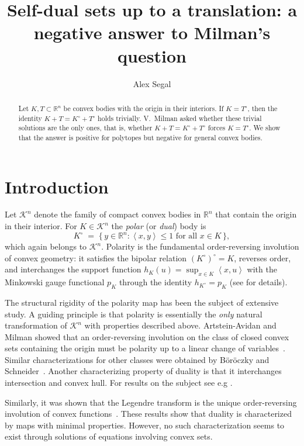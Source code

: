 \documentclass[12pt]{article}
\title{Self-dual sets up to a translation: a negative answer to Milman's question}
\author{Alex Segal}
\date{}
\theoremstyle{remark}
\newcommand{\R}{\mathbb R}
\newcommand{\Kn}{\mathcal{K}^n}
\newcommand{\pol}[1]{#1^{\circ}}
\newcommand{\ip}[2]{\left\langle #1,#2\right\rangle}
\begin{document}
\maketitle


\begin{abstract}
Let \(K,T\subset\mathbb R^n\) be convex bodies with the origin in their
interiors. If \(K=T^\circ\), then the identity
\(
K+T=K^\circ+T^\circ
\)
holds trivially. V.~Milman asked whether these trivial solutions are the only
ones, that is, whether
\(
K+T=K^\circ+T^\circ
\)
forces \(K=T^\circ\). We show that the answer is positive for polytopes but
negative for general convex bodies.
\end{abstract}

\section{Introduction}
Let $\Kn$ denote the family of compact convex bodies in $\R^n$ that contain the
origin in their interior. For $K \in \Kn$ the \emph{polar} (or \emph{dual}) body is
\begin{equation}\label{eq:polar}
  \pol{K} \;=\; \bigl\{\, y \in \R^n : \ip{x}{y} \le 1 \text{ for all } x \in K \,\bigr\},
\end{equation}
which again belongs to $\Kn$. Polarity is the fundamental order-reversing
involution of convex geometry: it satisfies the bipolar relation
$\pol{(\pol{K})} = K$, reverses order, and interchanges the support function
$h_K(u) = \sup_{x \in K} \ip{x}{u}$ with the Minkowski gauge functional $p_K$ through the
identity $h_{\pol{K}} = p_K$ (see \cite{schneider} for details). 
 
The structural rigidity of the polarity map has been the subject of extensive
study. A guiding principle is that polarity is essentially the
\emph{only} natural transformation of $\Kn$ with properties described above. Artstein-Avidan and Milman showed that an order-reversing involution on the class of closed convex sets containing the origin must be polarity up to a linear change of variables~\cite{AM-duality}.
Similar characterizations for other classes were obtained by B\"or\"oczky and
Schneider~\cite{BS-duality}. Another characterizing property of duality is that it interchanges intersection and convex hull. For results on the subject see e.g \cite{gruber, BS-duality, slomka}.

Similarly, it was shown that the Legendre transform is
 the unique order-reversing involution of convex
functions~\cite{AM-legendre}. These results show that
duality is characterized by maps with minimal properties. However, no such characterization seems to exist through solutions of equations involving convex sets.
 
\end{document}
